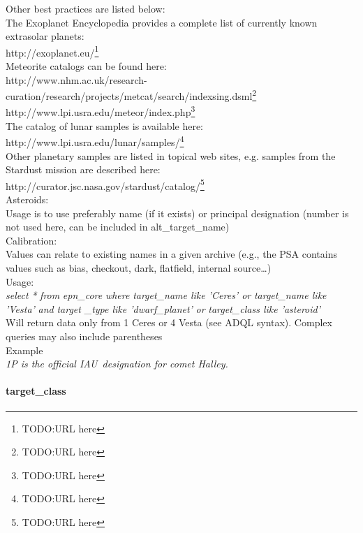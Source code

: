 \documentclass[11pt,a4paper]{ivoa}
\begin{document}
Other best practices are listed below: \\ The Exoplanet Encyclopedia provides a complete list of currently known extrasolar planets:\\ http://exoplanet.eu/\footnote{TODO:URL here} \\ Meteorite catalogs can be found here:\\ http://www.nhm.ac.uk/research-curation/research/projects/metcat/search/indexsing.dsml\footnote{TODO:URL here}\\ http://www.lpi.usra.edu/meteor/index.php\footnote{TODO:URL here} \\ The catalog of lunar samples is available here:\\ http://www.lpi.usra.edu/lunar/samples/\footnote{TODO:URL here} \\ Other planetary samples are listed in topical web sites, e.g. samples from the Stardust mission are described here:\\ http://curator.jsc.nasa.gov/stardust/catalog/\footnote{TODO:URL here} \\Asteroids:\\Usage is to use preferably name (if it exists) or principal designation (number is not used here, can be included in alt\_target\_name)\\Calibration:\\Values can relate to existing names in a given archive (e.g., the PSA contains values such as bias, checkout, dark, flatfield, internal source…)\\ Usage:\\ \emph{select} \emph{*} \emph{from} \emph{epn\_core} \emph{where} \emph{target\_name like 'Ceres' or} \emph{target\_name like 'Vesta'} \emph{and} \emph{target} \_\emph{type like 'dwarf\_planet'} \emph{or} \emph{target\_class like 'asteroid'} \\ Will return data only from 1 Ceres or 4 Vesta (see ADQL syntax). Complex queries may also include parentheses \\ Example\\ \emph{1P is the official IAU designation for comet Halley.}

\paragraph{target\_class}
\end{document}
